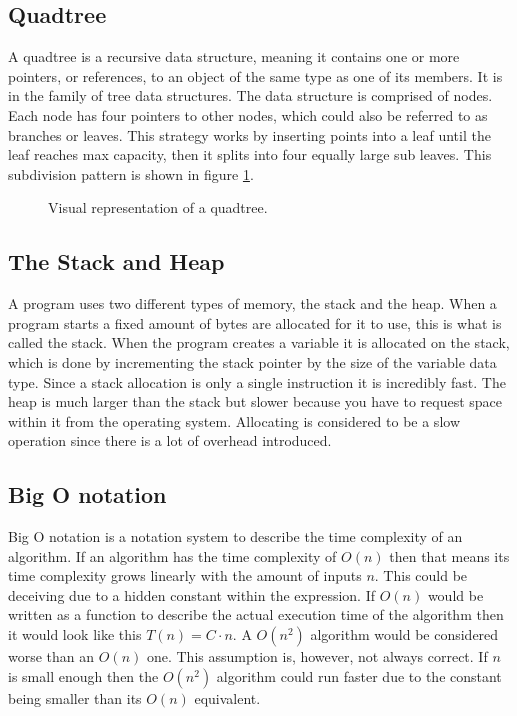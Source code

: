 \documentclass[a4paper, 12pt]{article}
\begin{document}
\subsection{Quadtree}
A quadtree is a recursive data structure, meaning it contains one or more
pointers, or references, to an object of the same type as one of its members. It
is in the family of tree data structures. The data structure is comprised of
nodes. Each node has four pointers to other nodes, which could also be referred
to as branches or leaves. This strategy works by inserting points into a leaf
until the leaf reaches max capacity, then it splits into four equally large sub
leaves. This subdivision pattern is shown in figure
\ref{fig:quadtree}.

\begin{figure}[ht]
    
    \caption{Visual representation of a quadtree.}
    \label{fig:quadtree}
\end{figure}

\subsection{The Stack and Heap}
A program uses two different types of memory, the stack and the heap. When a
program starts a fixed amount of bytes are allocated for it to use, this is what
is called the stack. When the program creates a variable it is allocated on the
stack, which is done by incrementing the stack pointer by the size of the
variable data type. Since a stack allocation is only a single instruction it is
incredibly fast. The heap is much larger than the stack but slower because you
have to request space within it from the operating system. Allocating is
considered to be a slow operation since there is a lot of overhead introduced.

\subsection{Big O notation}
Big O notation is a notation system to describe the time complexity of an
algorithm. If an algorithm has the time complexity of $O(n)$ then that means
its time complexity grows linearly with the amount of inputs $n$. This could be
deceiving due to a hidden constant within the expression. If $O(n)$ would be
written as a function to describe the actual execution time of the algorithm
then it would look like this $T(n) = C \cdot n$. A $O(n^{2})$ algorithm would
be considered worse than an $O(n)$ one. This assumption is, however, not always
correct. If $n$ is small enough then the $O(n^{2})$ algorithm could run faster
due to the constant being smaller than its $O(n)$ equivalent.
\end{document}

